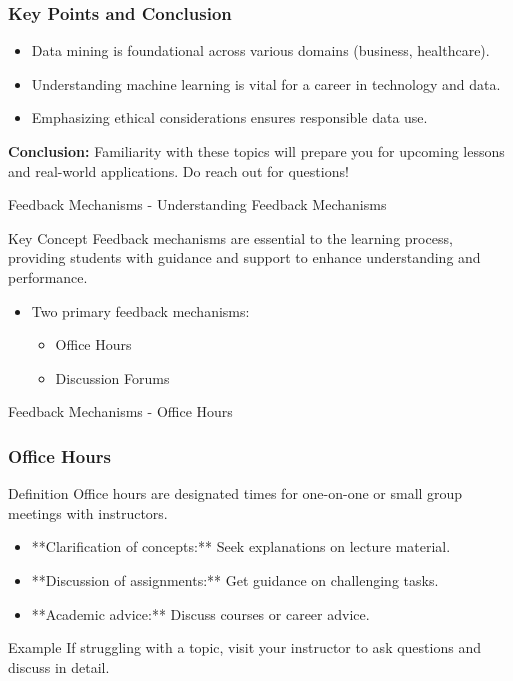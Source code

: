 \documentclass[aspectratio=169]{beamer}
\begin{document}
\begin{frame}[fragile]
    \frametitle{Key Points and Conclusion}
    \begin{itemize}
        \item Data mining is foundational across various domains (business, healthcare).
        \item Understanding machine learning is vital for a career in technology and data.
        \item Emphasizing ethical considerations ensures responsible data use.
    \end{itemize}

    \textbf{Conclusion:} Familiarity with these topics will prepare you for upcoming lessons and real-world applications. Do reach out for questions!
\end{frame}

\begin{frame}[fragile]{Feedback Mechanisms - Understanding Feedback Mechanisms}
    \begin{block}{Key Concept}
        Feedback mechanisms are essential to the learning process, providing students with guidance and support to enhance understanding and performance.
    \end{block}
    \begin{itemize}
        \item Two primary feedback mechanisms:
        \begin{itemize}
            \item Office Hours
            \item Discussion Forums
        \end{itemize}
    \end{itemize}
\end{frame}

\begin{frame}[fragile]{Feedback Mechanisms - Office Hours}
    \frametitle{Office Hours}
    \begin{block}{Definition}
        Office hours are designated times for one-on-one or small group meetings with instructors.
    \end{block}
    \begin{itemize}
        \item **Clarification of concepts:** Seek explanations on lecture material.
        \item **Discussion of assignments:** Get guidance on challenging tasks.
        \item **Academic advice:** Discuss courses or career advice.
    \end{itemize}
    \begin{block}{Example}
        If struggling with a topic, visit your instructor to ask questions and discuss in detail.
    \end{block}
\end{frame}
\end{document}
